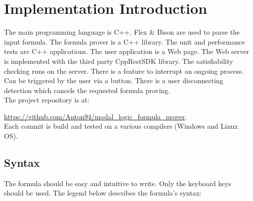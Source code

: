 \documentclass{article}
\begin{document}

	\newpage
	\section{Implementation Introduction}
	The main programming language is C++. Flex \& Bison are used to parse the input formula. The formula prover is a C++ library. The unit and performance tests are C++ applications.
	The user application is a Web page. The Web server is implemented with the third party CppRestSDK library. The satisfiability checking runs on the server. There is a feature to interrupt an ongoing process. Can be triggered by the user via a button. There is a user disconnecting detection which cancels the requested formula proving. \\
	The project repository is at:

	\url{https://github.com/Anton94/modal_logic_formula_prover}. \\
	Each commit is build and tested on a various compilers (Windows and Linux OS).
		
	\subsection{Syntax}
	The formula should be easy and intuitive to write. Only the keyboard keys should be used. The legend below describes the formula's syntax:
\end{document}

